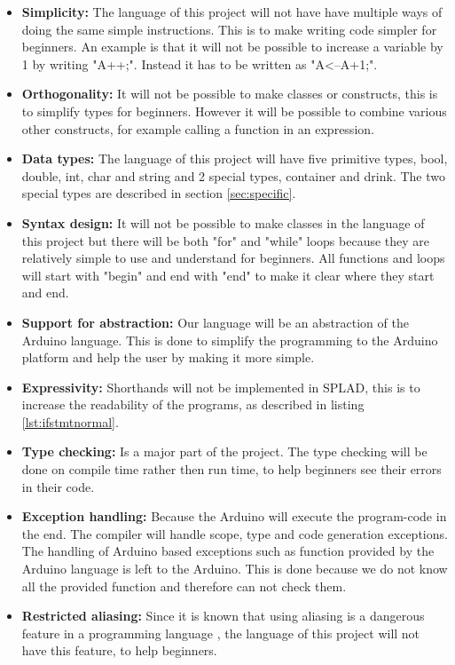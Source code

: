 \begin{itemize}
\item \textbf{Simplicity:} The language of this project will not have have multiple ways of doing the same simple instructions. This is to make writing code simpler for beginners. An example is that it will not be possible to increase a variable by 1 by writing "A++;". Instead it has to be written as "A<--A+1;".

\item \textbf{Orthogonality:} It will not be possible to make classes or constructs, this is to simplify types for beginners. However it will be possible to combine various other constructs, for example calling a function in an expression. 

\item \textbf{Data types:} The language of this project will have five primitive types, bool, double, int, char and string and 2 special types, container and drink. The two special types are described in section \ref{sec:specific}.

\item \textbf{Syntax design:} It will not be possible to make classes in the language of this project but there will be both "for" and "while" loops because they are relatively simple to use and understand for beginners. All functions and loops will start with "begin" and end with "end" to make it clear where they start and end.

\item \textbf{Support for abstraction:} Our language will be an abstraction of the Arduino language. This is done to simplify the programming to the Arduino platform and help the user by making it more simple.

\item \textbf{Expressivity:} Shorthands will not be implemented in SPLAD, this is to increase the readability of the programs, as described in listing \ref{lst:ifstmtnormal}.

\item \textbf{Type checking:} Is a major part of the project. The type checking will be done on compile time rather then run time, to help beginners see their errors in their code.

\item \textbf{Exception handling:} Because the Arduino will execute the program-code in the end. The compiler will handle scope, type and code generation exceptions. The handling of Arduino based exceptions such as function provided by the Arduino language is left to the Arduino. This is done because we do not know all the provided function and therefore can not check them.

\item \textbf{Restricted aliasing:} Since it is known that using aliasing is a dangerous feature in a programming language  \citep{sebesta}, the language of this project will not have this feature, to help beginners.
\end{itemize}

